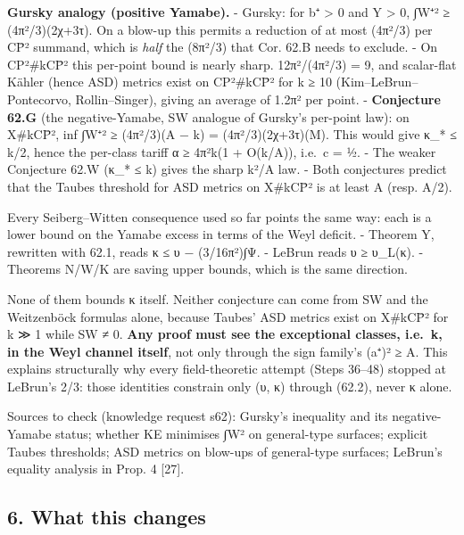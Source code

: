 \documentclass[
  10pt,
]{report}
\begin{document}
\textbf{Gursky analogy (positive Yamabe).} - Gursky: for b⁺
\textgreater{} 0 and Y \textgreater{} 0, ∫\textbar W⁺\textbar² ≥
(4π²/3)(2χ+3τ). On a blow-up this permits a reduction of at most (4π²/3)
per CP̄² summand, which is \emph{half} the (8π²/3) that Cor. 62.B needs
to exclude. - On CP²\#kCP̄² this per-point bound is nearly sharp.
12π²/(4π²/3) = 9, and scalar-flat Kähler (hence ASD) metrics exist on
CP²\#kCP̄² for k ≥ 10 (Kim--LeBrun--Pontecorvo, Rollin--Singer), giving
an average of 1.2π² per point. - \textbf{Conjecture 62.G} (the
negative-Yamabe, SW analogue of Gursky's per-point law): on X\#kCP̄², inf
∫\textbar W⁺\textbar² ≥ (4π²/3)(A − k) = (4π²/3)(2χ+3τ)(M). This would
give κ\_* ≤ k/2, hence the per-class tariff α ≥ 4π²k(1 + O(k/A)), i.e.~c
= ½. - The weaker Conjecture 62.W (κ\_* ≤ k) gives the sharp k²/A law. -
Both conjectures predict that the Taubes threshold for ASD metrics on
X\#kCP̄² is at least A (resp. A/2).

Every Seiberg--Witten consequence used so far points the same way: each
is a lower bound on the Yamabe excess in terms of the Weyl deficit. -
Theorem Y, rewritten with 62.1, reads κ ≤ υ − (3/16π²)∫Ψ. - LeBrun reads
υ ≥ υ\_L(κ). - Theorems N/W/K are saving upper bounds, which is the same
direction.

None of them bounds κ itself. Neither conjecture can come from SW and
the Weitzenböck formulas alone, because Taubes' ASD metrics exist on
X\#kCP̄² for k ≫ 1 while SW ≠ 0. \textbf{Any proof must see the
exceptional classes, i.e.~k, in the Weyl channel itself}, not only
through the sign family's (a⁺)² ≥ A. This explains structurally why
every field-theoretic attempt (Steps 36--48) stopped at LeBrun's 2/3:
those identities constrain only (υ, κ) through (62.2), never κ alone.

Sources to check (knowledge request s62): Gursky's inequality and its
negative-Yamabe status; whether KE minimises ∫\textbar W\textbar² on
general-type surfaces; explicit Taubes thresholds; ASD metrics on
blow-ups of general-type surfaces; LeBrun's equality analysis in Prop. 4
{[}27{]}.

\hypertarget{what-this-changes}{%
\subsection{6. What this changes}\label{what-this-changes}}
\end{document}
